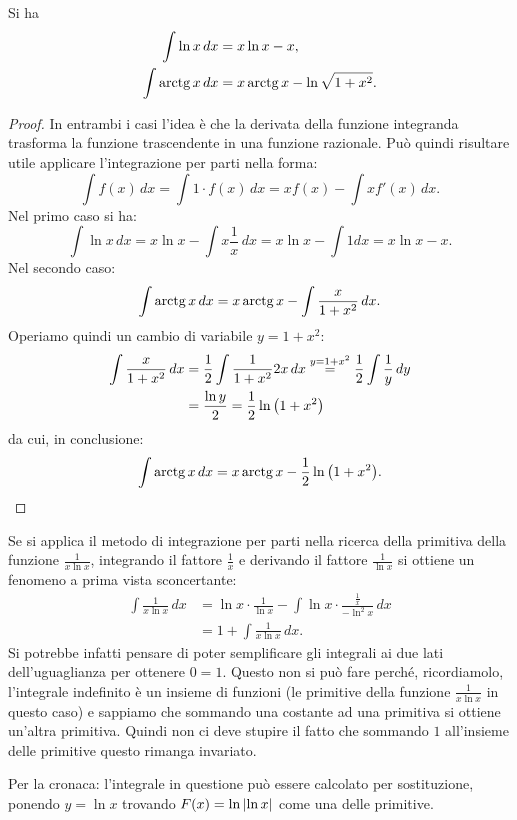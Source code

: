 \begin{theorem}
\mymark{***}
Si ha
\begin{align*}
  \int \ln x\, dx  &= x \ln x - x, \\
  \int \operatorname{arctg} x\, dx &= x \operatorname{arctg} x - \ln \sqrt{1+x^2}.\\
\end{align*}
\end{theorem}
%
\begin{proof}
\mymark{***}
In entrambi i casi l'idea è che la derivata della funzione integranda trasforma
la funzione trascendente in una funzione
razionale. Può quindi risultare utile applicare l'integrazione
per parti nella forma:
\[
  \int f(x)\, dx = \int 1\cdot f(x)\, dx = x f(x) - \int x f'(x)\, dx.
\]
Nel primo caso si ha:
\[
\int \ln x\, dx = x \ln x - \int x \frac{1}{x}\, dx
 = x \ln x - \int 1 dx = x \ln x - x.
\]
Nel secondo caso:
\[
\int \operatorname{arctg} x\, dx = x \operatorname{arctg} x - \int \frac{x}{1+x^2}\, dx.
\]
Operiamo quindi un cambio di variabile $y=1+x^2$:
\begin{align*}
\int \frac{x}{1+x^2}\, dx
&= \frac{1}{2}\int \frac{1}{1+x^2} 2x \, dx
\stackrel{y=1+x^2} = \frac{1}{2}\int \frac 1 y\, dy \\
&= \frac{\ln y}{2} = \frac{1}{2}\ln{\left( 1+x^2 \right)}
\end{align*}
da cui, in conclusione:
\[
 \int \operatorname{arctg} x\, dx = x \operatorname{arctg} x - \frac 1 2 \ln{\left( 1+x^2 \right)}.
\]
\end{proof}

\begin{remark}
Se si applica il metodo di integrazione per parti nella ricerca della primitiva
della funzione $\frac{1}{x\ln x}$, integrando il fattore $\frac 1 x$ e
derivando il fattore $\frac 1 {\ln x}$ si ottiene un fenomeno a prima vista
sconcertante:
\begin{align*}
  \int \frac{1}{x\ln x}\,dx
  &= \ln x \cdot \frac{1}{\ln x} - \int \ln x \cdot \frac{\frac 1 x}{-\ln^2 x}\, dx\\
  &= 1 + \int \frac{1}{x\ln x}\, dx.
\end{align*}
Si potrebbe infatti pensare di poter semplificare gli integrali ai due lati
dell'uguaglianza per ottenere $0=1$.
Questo non si può fare perché, ricordiamolo, l'integrale indefinito è un insieme
di funzioni (le primitive della funzione $\frac{1}{x\ln x}$ in questo caso)
e sappiamo che sommando una costante ad una primitiva si ottiene un'altra primitiva.
Quindi non ci deve stupire il fatto che sommando $1$ all'insieme delle primitive
questo rimanga invariato.

Per la cronaca: l'integrale in questione può essere calcolato per sostituzione,
ponendo $y=\ln x$ trovando $F(x) = \ln{\left|\ln x\right|}$ come una delle primitive.
\end{remark}

